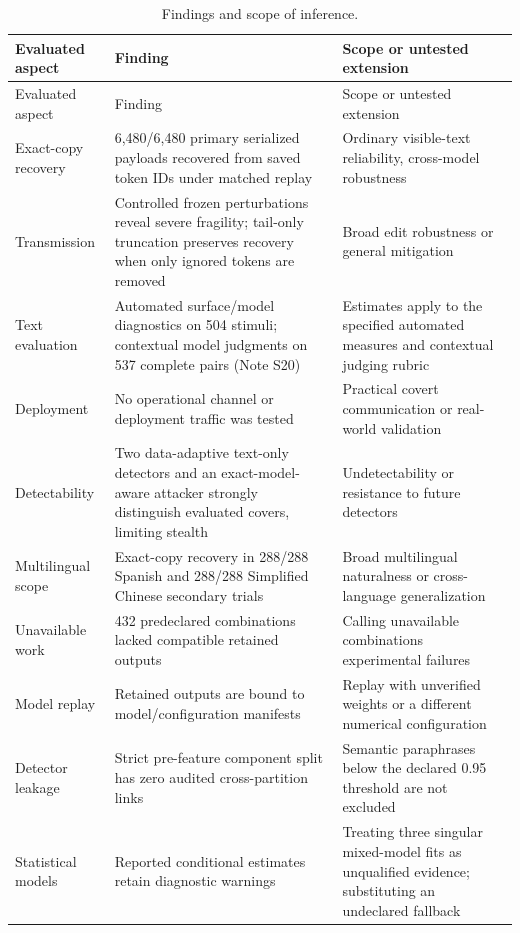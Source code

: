 \documentclass[fleqn,10pt]{wlscirep}
\begin{document}
\begin{longtable}{L{0.25\textwidth}L{0.31\textwidth}L{0.35\textwidth}}
\caption{\label{tab:claim-boundaries}Findings and scope of inference.}\\
\toprule
Evaluated aspect & Finding & Scope or untested extension \\
\midrule
\endfirsthead
\toprule
Evaluated aspect & Finding & Scope or untested extension \\
\midrule
\endhead
Exact-copy recovery & 6,480/6,480 primary serialized payloads recovered from saved token IDs under matched replay & Ordinary visible-text reliability, cross-model robustness \\
Transmission & Controlled frozen perturbations reveal severe fragility; tail-only truncation preserves recovery when only ignored tokens are removed & Broad edit robustness or general mitigation \\
Text evaluation & Automated surface/model diagnostics on 504 stimuli; contextual model judgments on 537 complete pairs (Note S20) & Estimates apply to the specified automated measures and contextual judging rubric \\
Deployment & No operational channel or deployment traffic was tested & Practical covert communication or real-world validation \\
Detectability & Two data-adaptive text-only detectors and an exact-model-aware attacker strongly distinguish evaluated covers, limiting stealth & Undetectability or resistance to future detectors \\
Multilingual scope & Exact-copy recovery in 288/288 Spanish and 288/288 Simplified Chinese secondary trials & Broad multilingual naturalness or cross-language generalization \\
Unavailable work & 432 predeclared combinations lacked compatible retained outputs & Calling unavailable combinations experimental failures \\
Model replay & Retained outputs are bound to model/configuration manifests & Replay with unverified weights or a different numerical configuration \\
Detector leakage & Strict pre-feature component split has zero audited cross-partition links & Semantic paraphrases below the declared 0.95 threshold are not excluded \\
Statistical models & Reported conditional estimates retain diagnostic warnings & Treating three singular mixed-model fits as unqualified evidence; substituting an undeclared fallback \\

\end{longtable}
\end{document}
